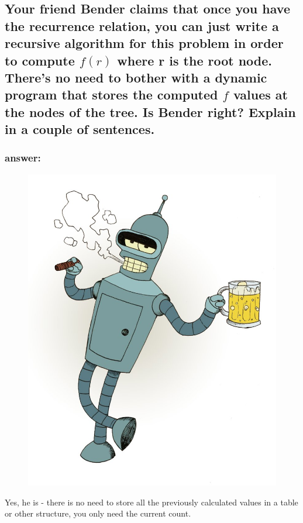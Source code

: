 \documentclass[titlepage]{article}
\theoremstyle{definition}
\begin{document}
  \subsection{Your friend Bender claims that once you have the recurrence
    relation, you can just write a recursive algorithm for this problem in
    order to compute $f(r)$ where r is the root node. There's no need to bother
    with a dynamic program that stores the computed $f$ values at the nodes of
    the tree. Is Bender right? Explain in a couple of sentences.}
      \subsubsection{answer:}
        \begin{figure}
          \centering
            \includegraphics[scale=0.3]{bender}
        \end{figure}
        Yes, he is - there is no need to store all the previously calculated values in
        a table or other structure, you only need the current count. 
\end{document}
